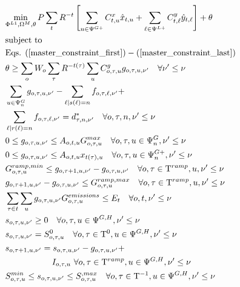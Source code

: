 \documentclass[final]{IEEEtran}
\newcommand{\Tau}{\mathrm{T}}
\begin{document}
\begin{align}
&\label{master_obj} \underset{\Phi^{L1}, \Omega^{M}, \theta}{\text{min}} \, P \sum\limits_{t} R^{-t} \left[ \sum\limits_{u \in \Psi^{G+}} C^x_{t, u} \hat{x}_{t, u} + \sum\limits_{\ell \in \Psi^{L+}} C^y_{t, \ell} \hat{y}_{t, \ell} \right] + \theta \\
&\text{subject to} \nonumber \\
&\text{Eqs. } (\ref{master_constraint_first}) - (\ref{master_constraint_last}) \\
&\theta \geq \sum\limits_o W_o \sum\limits_{\tau} R^{-t(\tau)} \sum\limits_{u} C_{o, \tau, u}^g g_{o, \tau, u, \nu'} \quad \forall \nu' \leq \nu \\
&\sum\limits_{u \in \Psi^G_{n}} g_{o, \tau, u, \nu'} - \sum\limits_{\ell | s(\ell) = n} f_{o, \tau, \ell, \nu'} + \nonumber \\
&\sum\limits_{\ell | r(\ell) = n} f_{o, \tau, \ell, \nu'} = d_{\tau, n, \nu'}^* \quad \forall o, \tau, n, \nu' \leq \nu \\
&0 \leq g_{o, \tau, u, \nu'} \leq A_{o, t, u} G_{o, \tau, u}^{max} \quad \forall o, \tau, u \in \Psi_n^G, \nu' \leq \nu \\
&0 \leq g_{o, \tau, u, \nu'} \leq A_{o, t, u} x_{t(\tau), u} \quad \forall o, \tau, u \in \Psi_n^{G+}, \nu' \leq \nu \\
&G^{ramp,min}_{o, \tau, u} \leq g_{o, \tau + 1, u, \nu'} - g_{o, \tau, u, \nu'} \quad \forall o, \tau \in \Tau^{ramp}, u, \nu' \leq \nu \\
&g_{o, \tau + 1, u, \nu'} - g_{o, \tau, u, \nu'} \leq G^{ramp,max}_{o, \tau, u} \quad \forall o, \tau \in \Tau^{ramp}, u, \nu' \leq \nu \\
&\sum\limits_{\tau \in t} \sum\limits_{u} g_{o, \tau, u, \nu'} G^{emissions}_{o, \tau, u} \leq E_{t} \quad \forall o, t, \nu' \leq \nu \\
&s_{o, \tau, u, \nu'} \geq 0 \quad \forall o, \tau, u \in \Psi^{G, H}, \nu' \leq \nu \\
&s_{o, \tau, u, \nu'} = S^0_{o, \tau, u} \quad \forall o, \tau \in \Tau^0, u \in \Psi^{G, H}, \nu' \leq \nu \\
&s_{o, \tau + 1, u, \nu'} = s_{o, \tau, u, \nu'} - g_{o, \tau, u, \nu'} + \nonumber \\
&\quad \quad \quad \quad \quad \, \, \, I_{o, \tau, u} \, \, \forall o, \tau \in \Tau^{ramp}, u \in \Psi^{G, H}, \nu' \leq \nu \\
&S^{min}_{o, \tau, u} \leq s_{o, \tau, u, \nu'} \leq S^{, max}_{o, \tau, u} \quad \forall o, \tau \in \Tau^{-1}, u \in \Psi^{G, H}, \nu' \leq \nu \\

\end{align}
\end{document}
